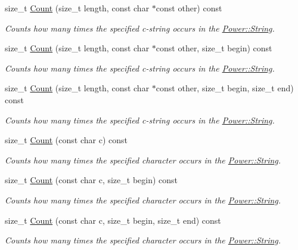\begin{DoxyCompactItemize}
size\+\_\+t \hyperlink{class_power_1_1_string_a2028976b7e5576e556a6dbb7e416d0f5}{Count} (size\+\_\+t length, const char $\ast$const other) const
\begin{DoxyCompactList}\small\item\em Counts how many times the specified c-\/string occurs in the \hyperlink{class_power_1_1_string}{Power\+::\+String}. \end{DoxyCompactList}\item 
size\+\_\+t \hyperlink{class_power_1_1_string_a844e07422a772b092d7ff06a61e2169d}{Count} (size\+\_\+t length, const char $\ast$const other, size\+\_\+t begin) const
\begin{DoxyCompactList}\small\item\em Counts how many times the specified c-\/string occurs in the \hyperlink{class_power_1_1_string}{Power\+::\+String}. \end{DoxyCompactList}\item 
size\+\_\+t \hyperlink{class_power_1_1_string_a14cd200c761131f0fb212aeba08e5058}{Count} (size\+\_\+t length, const char $\ast$const other, size\+\_\+t begin, size\+\_\+t end) const
\begin{DoxyCompactList}\small\item\em Counts how many times the specified c-\/string occurs in the \hyperlink{class_power_1_1_string}{Power\+::\+String}. \end{DoxyCompactList}\item 
size\+\_\+t \hyperlink{class_power_1_1_string_a745ee4d411ec80fd085017573760bff2}{Count} (const char c) const
\begin{DoxyCompactList}\small\item\em Counts how many times the specified character occurs in the \hyperlink{class_power_1_1_string}{Power\+::\+String}. \end{DoxyCompactList}\item 
size\+\_\+t \hyperlink{class_power_1_1_string_ac19eefa8206d6e3b4cf31c0315254592}{Count} (const char c, size\+\_\+t begin) const
\begin{DoxyCompactList}\small\item\em Counts how many times the specified character occurs in the \hyperlink{class_power_1_1_string}{Power\+::\+String}. \end{DoxyCompactList}\item 
size\+\_\+t \hyperlink{class_power_1_1_string_a7b4bf7dae5999a8ef6c7025aaa76e129}{Count} (const char c, size\+\_\+t begin, size\+\_\+t end) const
\begin{DoxyCompactList}\small\item\em Counts how many times the specified character occurs in the \hyperlink{class_power_1_1_string}{Power\+::\+String}. \end{DoxyCompactList}\item 

\end{DoxyCompactItemize}
